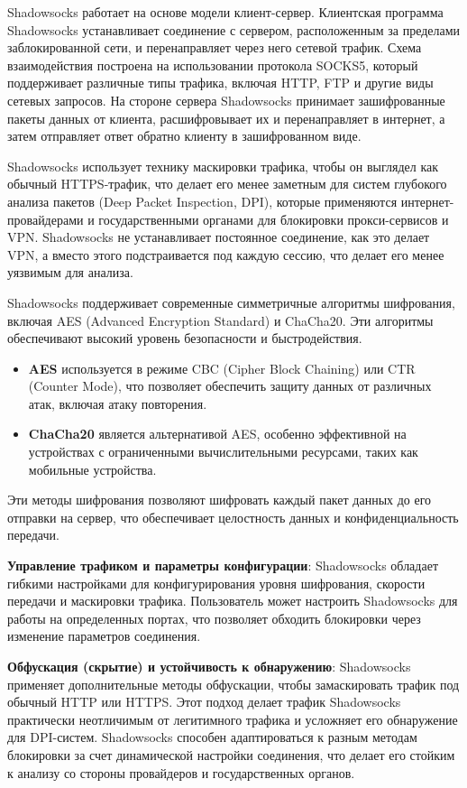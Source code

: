 \documentclass{SCWorks}
\begin{document}
\textbf{}Shadowsocks работает на основе модели клиент-сервер. Клиентская программа Shadowsocks устанавливает соединение с сервером, расположенным за пределами заблокированной сети, и перенаправляет через него сетевой трафик. Схема взаимодействия построена на использовании протокола SOCKS5, который поддерживает различные типы трафика, включая HTTP, FTP и другие виды сетевых запросов. На стороне сервера Shadowsocks принимает зашифрованные пакеты данных от клиента, расшифровывает их и перенаправляет в интернет, а затем отправляет ответ обратно клиенту в зашифрованном виде.

\textbf{}Shadowsocks использует технику маскировки трафика, чтобы он выглядел как обычный HTTPS-трафик, что делает его менее заметным для систем глубокого анализа пакетов (Deep Packet Inspection, DPI), которые применяются интернет-провайдерами и государственными органами для блокировки прокси-сервисов и VPN. Shadowsocks не устанавливает постоянное соединение, как это делает VPN, а вместо этого подстраивается под каждую сессию, что делает его менее уязвимым для анализа.

\textbf{}Shadowsocks поддерживает современные симметричные алгоритмы шифрования, включая AES (Advanced Encryption Standard) и ChaCha20. Эти алгоритмы обеспечивают высокий уровень безопасности и быстродействия. 
\begin{itemize}
    \item \textbf{AES} используется в режиме CBC (Cipher Block Chaining) или CTR (Counter Mode), что позволяет обеспечить защиту данных от различных атак, включая атаку повторения.
    \item \textbf{ChaCha20} является альтернативой AES, особенно эффективной на устройствах с ограниченными вычислительными ресурсами, таких как мобильные устройства.
\end{itemize}
Эти методы шифрования позволяют шифровать каждый пакет данных до его отправки на сервер, что обеспечивает целостность данных и конфиденциальность передачи.

\textbf{Управление трафиком и параметры конфигурации}: Shadowsocks обладает гибкими настройками для конфигурирования уровня шифрования, скорости передачи и маскировки трафика. Пользователь может настроить Shadowsocks для работы на определенных портах, что позволяет обходить блокировки через изменение параметров соединения.

\textbf{Обфускация (скрытие) и устойчивость к обнаружению}: Shadowsocks применяет дополнительные методы обфускации, чтобы замаскировать трафик под обычный HTTP или HTTPS. Этот подход делает трафик Shadowsocks практически неотличимым от легитимного трафика и усложняет его обнаружение для DPI-систем. Shadowsocks способен адаптироваться к разным методам блокировки за счет динамической настройки соединения, что делает его стойким к анализу со стороны провайдеров и государственных органов.
\end{document}
